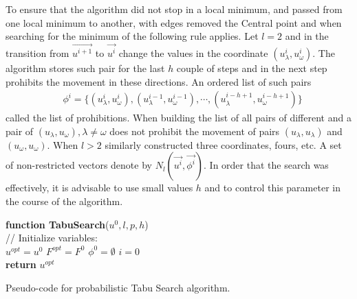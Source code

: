 \documentclass[]{TAACpaper}
\begin{document}
To ensure that the algorithm did not stop in a local minimum, and passed from one local minimum to another, with edges removed the Central point and when searching for the minimum of the following rule applies. Let $l=2$ and in the transition from $\vec{u^{i+1}}$ to $\vec{u^i}$ change the values in the coordinate $(u_\lambda^{i}, u_\omega^{i})$. The algorithm stores such pair for the last $h$ couple of steps and in the next step prohibits the movement in these directions. An ordered list of such pairs
\begin{align} 
& \phi^i=\{(u_\lambda^{i},u_\omega^{i}),(u_\lambda^{i-1},u_\omega^{i-1}),\cdots,(u_\lambda^{i-h+1},u_\omega^{i-h+1}) \} 
\end{align}	
called the list of prohibitions. When building the list of all pairs of different and a pair of $(u_\lambda,u_\omega),\lambda \ne \omega$ does not prohibit the movement of pairs $(u_\lambda,u_\lambda)$ and $(u_\omega,u_\omega)$. When $l>2$ similarly constructed three coordinates, fours, etc. A set of non-restricted vectors denote by $N_l(\vec{u^i},\vec{\phi^i})$. In order that the search was effectively, it is advisable to use small values $h$ and to control this parameter in the course of the algorithm.

\begin{algorithm}[H]
	\textbf{function TabuSearch}($u^0,l,p,h$) \\
	// Initialize variables:	\\
	$u^{opt} = u^0$
	$F^{opt} = F^0$
	$\phi^{0} =  \emptyset$
	$i=0$ \\
	\textbf{return} $u^{opt}$
	
\caption{Pseudo-code for probabilistic Tabu Search algorithm.}
\label{alg:TabuSearch}
\end{algorithm}
\end{document}
